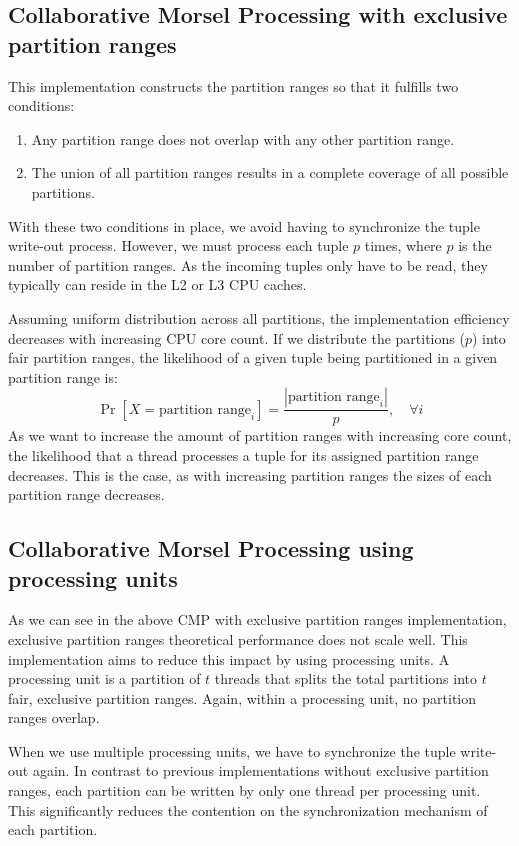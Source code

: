\subsection{Collaborative Morsel Processing with exclusive partition ranges}
This implementation constructs the partition ranges so that it fulfills two conditions:
\begin{enumerate}
  \item Any partition range does not overlap with any other partition range.
  \item The union of all partition ranges results in a complete coverage of all possible partitions.
\end{enumerate}
With these two conditions in place, we avoid having to synchronize the tuple write-out process.
However, we must process each tuple $p$ times, where $p$ is the number of partition ranges.
As the incoming tuples only have to be read, they typically can reside in the L2 or L3 \ac{CPU} caches.

Assuming uniform distribution across all partitions, the implementation efficiency decreases with increasing CPU core count.
If we distribute the partitions ($p$) into fair partition ranges, the likelihood of a given tuple being partitioned in a given partition range is:
\begin{equation}\label{equation-CMP-exclusive-partition-ranges}
  \Pr[X=\textrm{partition range}_i] = \frac{|\textrm{partition range}_i|}{p},  \quad \forall i
\end{equation}
As we want to increase the amount of partition ranges with increasing core count, the likelihood that a thread processes a tuple for its assigned partition range decreases.
This is the case, as with increasing partition ranges the sizes of each partition range decreases.
\subsection{Collaborative Morsel Processing using processing units}
As we can see in the above \ac{CMP} with exclusive partition ranges implementation, exclusive partition ranges theoretical performance does not scale well.
This implementation aims to reduce this impact by using processing units.
A processing unit is a partition of $t$ threads that splits the total partitions into $t$ fair, exclusive partition ranges.
Again, within a processing unit, no partition ranges overlap.

When we use multiple processing units, we have to synchronize the tuple write-out again.
In contrast to previous implementations without exclusive partition ranges, each partition can be written by only one thread per processing unit.
This significantly reduces the contention on the synchronization mechanism of each partition.

